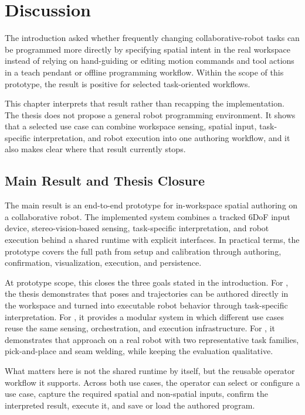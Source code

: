 \chapter{Discussion} \label{chapter:ch6_discussion}

The introduction asked whether frequently changing collaborative-robot tasks can be programmed more directly by specifying spatial intent in the real workspace instead of relying on hand-guiding or editing motion commands and tool actions in a teach pendant or offline programming workflow. Within the scope of this prototype, the result is positive for selected task-oriented workflows.

This chapter interprets that result rather than recapping the implementation. The thesis does not propose a general robot programming environment. It shows that a selected use case can combine workspace sensing, spatial input, task-specific interpretation, and robot execution into one authoring workflow, and it also makes clear where that result currently stops.

\section{Main Result and Thesis Closure}

The main result is an end-to-end prototype for in-workspace spatial authoring on a collaborative robot. The implemented system combines a tracked 6DoF input device, stereo-vision-based sensing, task-specific interpretation, and robot execution behind a shared runtime with explicit interfaces. In practical terms, the prototype covers the full path from setup and calibration through authoring, confirmation, visualization, execution, and persistence.

At prototype scope, this closes the three goals stated in the introduction. For , the thesis demonstrates that poses and trajectories can be authored directly in the workspace and turned into executable robot behavior through task-specific interpretation. For , it provides a modular system in which different use cases reuse the same sensing, orchestration, and execution infrastructure. For , it demonstrates that approach on a real robot with two representative task families, pick-and-place and seam welding, while keeping the evaluation qualitative.

What matters here is not the shared runtime by itself, but the reusable operator workflow it supports. Across both use cases, the operator can select or configure a use case, capture the required spatial and non-spatial inputs, confirm the interpreted result, execute it, and save or load the authored program.


